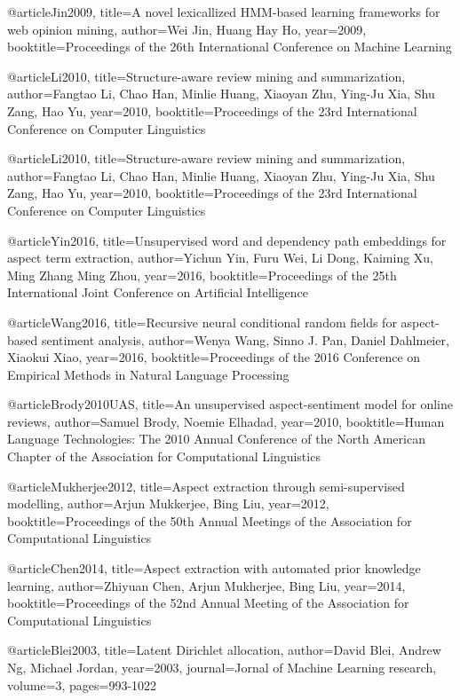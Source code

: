 @article{Jin2009,
title={A novel lexicallized HMM-based learning frameworks for web opinion mining},
author={Wei Jin, Huang Hay Ho},
year={2009},
booktitle={Proceedings of the 26th International Conference on Machine Learning}
}

@article{Li2010,
title={Structure-aware review mining and summarization},
author={Fangtao Li, Chao Han, Minlie Huang, Xiaoyan Zhu, Ying-Ju Xia, Shu Zang, Hao Yu},
year={2010},
booktitle={Proceedings of the 23rd International Conference on Computer Linguistics}
}

@article{Li2010,
title={Structure-aware review mining and summarization},
author={Fangtao Li, Chao Han, Minlie Huang, Xiaoyan Zhu, Ying-Ju Xia, Shu Zang, Hao Yu},
year={2010},
booktitle={Proceedings of the 23rd International Conference on Computer Linguistics}
}

@article{Yin2016,
title={Unsupervised word and dependency path embeddings for aspect term extraction},
author={Yichun Yin, Furu Wei, Li Dong, Kaiming Xu, Ming Zhang Ming Zhou},
year={2016},
booktitle={Proceedings of the 25th International Joint Conference on Artificial Intelligence}
}

@article{Wang2016,
title={Recursive neural conditional random fields for aspect-based sentiment analysis},
author={Wenya Wang, Sinno J. Pan, Daniel Dahlmeier, Xiaokui Xiao},
year={2016},
booktitle={Proceedings of the 2016 Conference on Empirical Methods in Natural Language Processing}
}

@article{Brody2010UAS,
title={An unsupervised aspect-sentiment model for online reviews},
author={Samuel Brody, Noemie Elhadad},
year={2010},
booktitle={Human Language Technologies: The 2010 Annual Conference of the North American Chapter of the Association for Computational Linguistics}
}

@article{Mukherjee2012,
title={Aspect extraction through semi-supervised modelling},
author={Arjun Mukkerjee, Bing Liu},
year={2012},
booktitle={Proceedings of the 50th Annual Meetings of the Association for Computational Linguistics}
}

@article{Chen2014,
title={Aspect extraction with automated prior knowledge learning},
author={Zhiyuan Chen, Arjun Mukherjee, Bing Liu},
year={2014},
booktitle={Proceedings of the 52nd Annual Meeting of the Association for Computational Linguistics}
}

@article{Blei2003,
title={Latent Dirichlet allocation},
author={David Blei, Andrew Ng, Michael Jordan},
year={2003},
journal={Jornal of Machine Learning research},
volume={3},
pages={993-1022}
}

